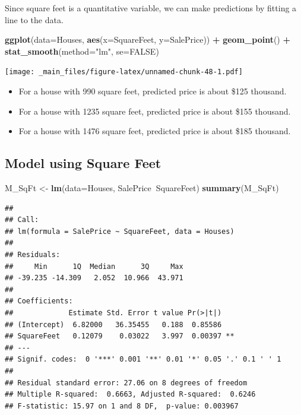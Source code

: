 \documentclass[]{book}
\newenvironment{Shaded}{\begin{snugshade}}{\end{snugshade}}
\newcommand{\KeywordTok}[1]{\textcolor[rgb]{0.13,0.29,0.53}{\textbf{#1}}}
\newcommand{\DataTypeTok}[1]{\textcolor[rgb]{0.13,0.29,0.53}{#1}}
\newcommand{\StringTok}[1]{\textcolor[rgb]{0.31,0.60,0.02}{#1}}
\newcommand{\OtherTok}[1]{\textcolor[rgb]{0.56,0.35,0.01}{#1}}
\newcommand{\OperatorTok}[1]{\textcolor[rgb]{0.81,0.36,0.00}{\textbf{#1}}}
\newcommand{\NormalTok}[1]{#1}
\providecommand{\tightlist}{%
  \setlength{\itemsep}{0pt}\setlength{\parskip}{0pt}}
\begin{document}
Since square feet is a quantitative variable, we can make predictions by
fitting a line to the data.

\begin{Shaded}
\begin{Highlighting}[]
\KeywordTok{ggplot}\NormalTok{(}\DataTypeTok{data=}\NormalTok{Houses, }\KeywordTok{aes}\NormalTok{(}\DataTypeTok{x=}\NormalTok{SquareFeet, }\DataTypeTok{y=}\NormalTok{SalePrice)) }\OperatorTok{+}\StringTok{ }\KeywordTok{geom_point}\NormalTok{() }\OperatorTok{+}\StringTok{ }
\StringTok{  }\KeywordTok{stat_smooth}\NormalTok{(}\DataTypeTok{method=}\StringTok{"lm"}\NormalTok{, }\DataTypeTok{se=}\OtherTok{FALSE}\NormalTok{)}
\end{Highlighting}
\end{Shaded}

\texttt{[image: \_main\_files/figure-latex/unnamed-chunk-48-1.pdf]}

\begin{itemize}
\tightlist
\item
  For a house with 990 square feet, predicted price is about \$125
  thousand.\\
\item
  For a house with 1235 square feet, predicted price is about \$155
  thousand.\\
\item
  For a house with 1476 square feet, predicted price is about \$185
  thousand.
\end{itemize}

\subsection{Model using Square Feet}\label{model-using-square-feet}

\begin{Shaded}
\begin{Highlighting}[]
\NormalTok{M_SqFt <-}\StringTok{ }\KeywordTok{lm}\NormalTok{(}\DataTypeTok{data=}\NormalTok{Houses, SalePrice}\OperatorTok{~}\NormalTok{SquareFeet) }
\KeywordTok{summary}\NormalTok{(M_SqFt)}
\end{Highlighting}
\end{Shaded}

\begin{verbatim}
## 
## Call:
## lm(formula = SalePrice ~ SquareFeet, data = Houses)
## 
## Residuals:
##     Min      1Q  Median      3Q     Max 
## -39.235 -14.309   2.052  10.966  43.971 
## 
## Coefficients:
##             Estimate Std. Error t value Pr(>|t|)   
## (Intercept)  6.82000   36.35455   0.188  0.85586   
## SquareFeet   0.12079    0.03022   3.997  0.00397 **
## ---
## Signif. codes:  0 '***' 0.001 '**' 0.01 '*' 0.05 '.' 0.1 ' ' 1
## 
## Residual standard error: 27.06 on 8 degrees of freedom
## Multiple R-squared:  0.6663, Adjusted R-squared:  0.6246 
## F-statistic: 15.97 on 1 and 8 DF,  p-value: 0.003967
\end{verbatim}
\end{document}
